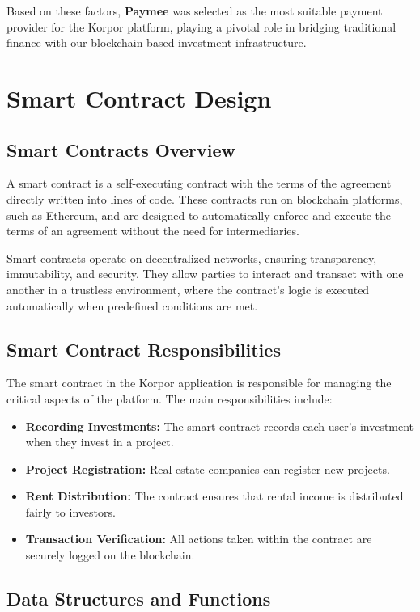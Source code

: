 Based on these factors, \textbf{Paymee} was selected as the most suitable payment provider for the Korpor platform, playing a pivotal role in bridging traditional finance with our blockchain-based investment infrastructure.

\section{Smart Contract Design}

\subsection{Smart Contracts Overview}

A smart contract is a self-executing contract with the terms of the agreement directly written into lines of code. These contracts run on blockchain platforms, such as Ethereum, and are designed to automatically enforce and execute the terms of an agreement without the need for intermediaries. 

Smart contracts operate on decentralized networks, ensuring transparency, immutability, and security. They allow parties to interact and transact with one another in a trustless environment, where the contract's logic is executed automatically when predefined conditions are met.

\subsection{Smart Contract Responsibilities}

The smart contract in the Korpor application is responsible for managing the critical aspects of the platform. The main responsibilities include:

\begin{itemize}
    \item \textbf{Recording Investments:} The smart contract records each user's investment when they invest in a project.
    \item \textbf{Project Registration:} Real estate companies can register new projects.
    \item \textbf{Rent Distribution:} The contract ensures that rental income is distributed fairly to investors.
    \item \textbf{Transaction Verification:} All actions taken within the contract are securely logged on the blockchain.
\end{itemize}

\subsection{Data Structures and Functions}


